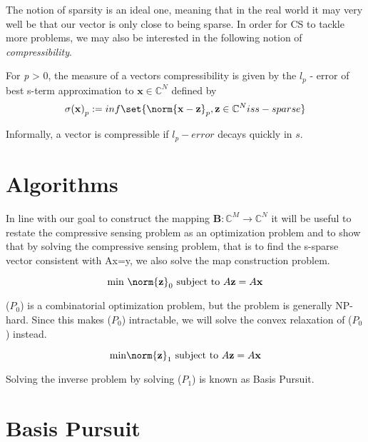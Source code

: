 The notion of sparsity is an ideal one, meaning that in the real world it may very well be that our vector is only close to being sparse. In order for CS to tackle more problems, we may also be interested in the following notion of  \emph{compressibility}. 


\begin{definition}
For \emph{p} > 0, the measure of a vectors compressibility is given by the $l_{p}$ - error of best s-term approximation to $\mathbf{x} \in \mathbb{C}^{N}$ defined by $$ \sigma \mathbf{(x)}_{p}:= inf \set{\norm{ \mathbf{x}-\mathbf{z}}_{p}, \mathbf{z} \in \mathbb{C}^{N}  is s-sparse } $$
\end{definition}	

Informally, a vector is compressible if $l_{p}-error$ decays quickly in $s$.

\section{Algorithms}

In line with our goal to construct the mapping $\mathbf{B}: \mathbb{C}^{M}\rightarrow  \mathbb{C}^{N}$ it will be useful to restate the compressive sensing problem as an optimization problem and to show that by solving the compressive sensing problem, that is to find the  s-sparse vector consistent with Ax=y,  we also solve the map construction problem.



\begin{equation} 
\text{min} \ \norm{ \mathbf{z}}_{0}  \ \text{subject to}  \ A \mathbf{z} = A \mathbf{x}
\end{equation}


($P_0$) is a combinatorial optimization problem, but the problem is generally NP-hard. Since this makes ($P_0$) intractable, we will solve the convex relaxation of ($P_0$) instead. 


\begin{equation} 
\text{min} \norm{ \mathbf{z}}_{1} \ \text{subject to} \ A\mathbf{z} = A\mathbf{x}
\end{equation}


Solving the inverse problem by solving ($P_{1}$) is known as Basis Pursuit. 



\section*{Basis Pursuit} 

